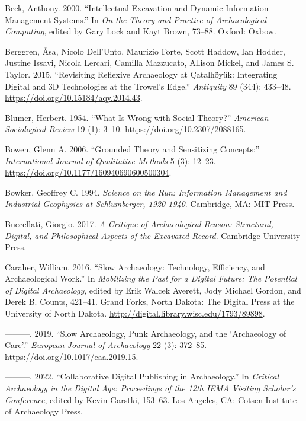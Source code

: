 \documentclass[
]{article}
\newlength{\cslhangindent}
\newenvironment{CSLReferences}[2] %
 {\begin{list}{}{%
  \setlength{\itemindent}{0pt}
  \setlength{\leftmargin}{0pt}
  \setlength{\parsep}{0pt}
  \ifodd #1
   \setlength{\leftmargin}{\cslhangindent}
   \setlength{\itemindent}{-1\cslhangindent}
  \fi
  \setlength{\itemsep}{#2\baselineskip}}}
 {\end{list}}
\begin{document}
\begin{CSLReferences}{1}{0}
Beck, Anthony. 2000. {``Intellectual Excavation and Dynamic Information
Management Systems.''} In \emph{On the {Theory} and {Practice} of
{Archaeological Computing}}, edited by Gary Lock and Kayt Brown, 73--88.
Oxford: Oxbow.

Berggren, Åsa, Nicolo Dell'Unto, Maurizio Forte, Scott Haddow, Ian
Hodder, Justine Issavi, Nicola Lercari, Camilla Mazzucato, Allison
Mickel, and James S. Taylor. 2015. {``Revisiting Reflexive Archaeology
at {Çatalhöyük}: {Integrating} Digital and {3D} Technologies at the
Trowel's Edge.''} \emph{Antiquity} 89 (344): 433--48.
\url{https://doi.org/10.15184/aqy.2014.43}.

Blumer, Herbert. 1954. {``What Is Wrong with Social Theory?''}
\emph{American Sociological Review} 19 (1): 3--10.
\url{https://doi.org/10.2307/2088165}.

Bowen, Glenn A. 2006. {``Grounded {Theory} and {Sensitizing
Concepts}:''} \emph{International Journal of Qualitative Methods} 5 (3):
12--23. \url{https://doi.org/10.1177/160940690600500304}.

Bowker, Geoffrey C. 1994. \emph{Science on the {Run}: {Information
Management} and {Industrial Geophysics} at {Schlumberger}, 1920-1940}.
Cambridge, MA: MIT Press.

Buccellati, Giorgio. 2017. \emph{A {Critique} of {Archaeological
Reason}: {Structural}, {Digital}, and {Philosophical Aspects} of the
{Excavated Record}}. Cambridge University Press.

Caraher, William. 2016. {``Slow {Archaeology}: {Technology},
{Efficiency}, and {Archaeological Work}.''} In \emph{Mobilizing the
{Past} for a {Digital Future}: {The Potential} of {Digital
Archaeology}}, edited by Erik Walcek Averett, Jody Michael Gordon, and
Derek B. Counts, 421--41. Grand Forks, North Dakota: The Digital Press
at the University of North Dakota.
\url{http://digital.library.wisc.edu/1793/89898}.

---------. 2019. {``Slow {Archaeology}, {Punk Archaeology}, and the
{`{Archaeology} of {Care}'}.''} \emph{European Journal of Archaeology}
22 (3): 372--85. \url{https://doi.org/10.1017/eaa.2019.15}.

---------. 2022. {``Collaborative {Digital Publishing} in
{Archaeology}.''} In \emph{Critical {Archaeology} in the {Digital Age}:
{Proceedings} of the 12th {IEMA Visiting Scholar}'s {Conference}},
edited by Kevin Garstki, 153--63. Los Angeles, CA: Cotsen Institute of
Archaeology Press.


\end{CSLReferences}
\end{document}
